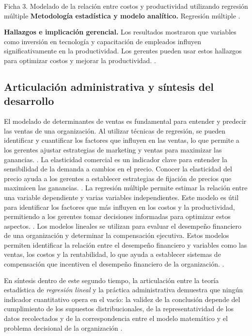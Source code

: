 {\begin{fichainvestigacion}{Ficha 3. Modelado de la relación entre costos y productividad utilizando regresión múltiple}
\textbf{Metodología estadística y modelo analítico.} Regresión múltiple \citep{wackerly2010,lind2012}.

\textbf{Hallazgos e implicación gerencial.} Los resultados mostraron que variables como inversión en tecnología y capacitación de empleados influyen significativamente en la productividad. Los gerentes pueden usar estos hallazgos para optimizar costos y mejorar la productividad. \citep{nistHandbook}.
\end{fichainvestigacion}


\subsection{Articulación administrativa y síntesis del desarrollo}
El modelado de determinantes de ventas es fundamental para entender y predecir las ventas de una organización. Al utilizar técnicas de regresión, se pueden identificar y cuantificar los factores que influyen en las ventas, lo que permite a los gerentes ajustar estrategias de marketing y ventas para maximizar las ganancias. \citep{holmesBusiness2023,nistHandbook}.
La elasticidad comercial es un indicador clave para entender la sensibilidad de la demanda a cambios en el precio. Conocer la elasticidad del precio ayuda a los gerentes a establecer estrategias de fijación de precios que maximicen las ganancias. \citep{holmesBusiness2023,nistHandbook}.
La regresión múltiple permite estimar la relación entre una variable dependiente y varias variables independientes. Este modelo es útil para identificar los factores que más influyen en los costos y la productividad, permitiendo a los gerentes tomar decisiones informadas para optimizar estos aspectos. \citep{holmesBusiness2023,nistHandbook}.
Los modelos lineales se utilizan para evaluar el desempeño financiero de una organización y determinar la compensación ejecutiva. Estos modelos permiten identificar la relación entre el desempeño financiero y variables como las ventas, los costos y la rentabilidad, lo que ayuda a establecer sistemas de compensación que incentiven el desempeño financiero de la organización. \citep{holmesBusiness2023,nistHandbook}.

En síntesis dentro de este segundo tiempo, la articulación entre la teoría estadística de \textit{regresión lineal} y la práctica administrativa demuestra que ningún indicador cuantitativo opera en el vacío: la validez de la conclusión depende del cumplimiento de los supuestos distribucionales, de la representatividad de los datos recolectados y de la correspondencia entre el modelo matemático y el problema decisional de la organización \citep{anderson2012,nistHandbook,guarin2002}.

}

